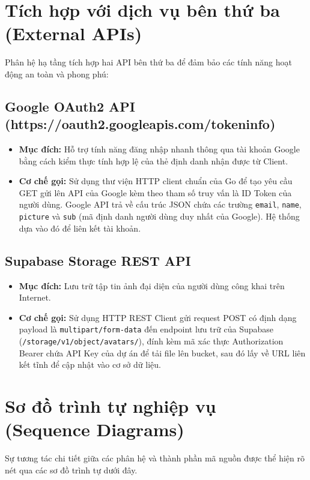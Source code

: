 \documentclass[14pt,a4paper,oneside]{extreport}
\begin{document}
\section{Tích hợp với dịch vụ bên thứ ba (External APIs)}
Phân hệ hạ tầng tích hợp hai API bên thứ ba để đảm bảo các tính năng hoạt động an toàn và phong phú:

\subsection{Google OAuth2 API (https://oauth2.googleapis.com/tokeninfo)}
\begin{itemize}[leftmargin=1.5cm]
  \item \textbf{Mục đích:} Hỗ trợ tính năng đăng nhập nhanh thông qua tài khoản Google bằng cách kiểm thực tính hợp lệ của thẻ định danh nhận được từ Client.
  \item \textbf{Cơ chế gọi:} Sử dụng thư viện HTTP client chuẩn của Go để tạo yêu cầu GET gửi lên API của Google kèm theo tham số truy vấn là ID Token của người dùng. Google API trả về cấu trúc JSON chứa các trường \texttt{email}, \texttt{name}, \texttt{picture} và \texttt{sub} (mã định danh người dùng duy nhất của Google). Hệ thống dựa vào đó để liên kết tài khoản.
\end{itemize}

\subsection{Supabase Storage REST API}
\begin{itemize}[leftmargin=1.5cm]
  \item \textbf{Mục đích:} Lưu trữ tập tin ảnh đại diện của người dùng công khai trên Internet.
  \item \textbf{Cơ chế gọi:} Sử dụng HTTP REST Client gửi request POST có định dạng payload là \texttt{multipart/form-data} đến endpoint lưu trữ của Supabase (\texttt{/storage/\allowbreak v1/\allowbreak object/\allowbreak avatars/}), đính kèm mã xác thực Authorization Bearer chứa API Key của dự án để tải file lên bucket, sau đó lấy về URL liên kết tĩnh để cập nhật vào cơ sở dữ liệu.
\end{itemize}

\section{Sơ đồ trình tự nghiệp vụ (Sequence Diagrams)}
Sự tương tác chi tiết giữa các phân hệ và thành phần mã nguồn được thể hiện rõ nét qua các sơ đồ trình tự dưới đây.
\end{document}
